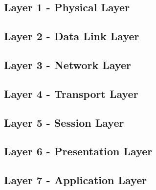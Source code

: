 \documentclass{article}
\begin{document}
\subsection{Layer 1 - Physical Layer}
\subsection{Layer 2 - Data Link Layer}
\subsection{Layer 3 - Network Layer}
\subsection{Layer 4 - Transport Layer}
\subsection{Layer 5 - Session Layer}
\subsection{Layer 6 - Presentation Layer}
\subsection{Layer 7 - Application Layer}
\end{document}
